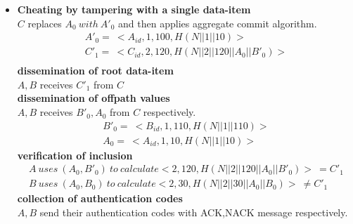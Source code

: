 \begin{exmp}
\begin{itemize}
	\item \textbf{Cheating by tampering with a single data-item}\\
		$C$ replaces $A_{0}\ with\ A'_{0}$ and then applies aggregate commit algorithm.
		\begin{equation}
			\begin{array}{l}
				A'_{0} =\ <A_{id},1,100, H(N||1||10)>\\
				C'_{1} =\ <C_{id},2,120, H(N||2||120||A_{0}||B'_{0})>\\
			\end{array}
		\end{equation}
		\textbf{dissemination of root data-item}\\
			$A,B$ receives $C'_{1}$ from $C$\\
		\textbf{dissemination of offpath values}\\
			$A,B$ receives $B'_{0},A_{0}$ from $C$ respectively.	
			\begin{equation}
				\begin{array}{l}
					B'_{0} =\ <B_{id},1,110, H(N||1||110)>\\
					A_{0} =\ <A_{id},1,10,H(N||1||10)>
				\end{array}
			\end{equation}
		\textbf{verification of inclusion}
			\begin{equation}
				\begin{array}{l}
					A\ uses\ (A_{0}, B'_{0})\ to\ calculate <2,120,H(N||2||120||A_{0}||B'_{0})>\ = C'_{1}\\
					B\ uses\ (A_{0}, B_{0})\ to\ calculate <2,30,H(N||2||30||A_{0}||B_{0})>\ \neq C'_{1}
				\end{array}
			\end{equation}
		\textbf{collection of authentication codes}\\
			$A,B$ send their authentication codes with ACK,NACK message respectively.


\end{itemize}
\end{exmp}

